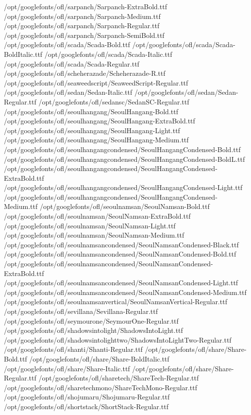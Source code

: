 /opt/googlefonts/ofl/sarpanch/Sarpanch-ExtraBold.ttf
/opt/googlefonts/ofl/sarpanch/Sarpanch-Medium.ttf
/opt/googlefonts/ofl/sarpanch/Sarpanch-Regular.ttf
/opt/googlefonts/ofl/sarpanch/Sarpanch-SemiBold.ttf
/opt/googlefonts/ofl/scada/Scada-Bold.ttf
/opt/googlefonts/ofl/scada/Scada-BoldItalic.ttf
/opt/googlefonts/ofl/scada/Scada-Italic.ttf
/opt/googlefonts/ofl/scada/Scada-Regular.ttf
/opt/googlefonts/ofl/scheherazade/Scheherazade-R.ttf
/opt/googlefonts/ofl/seaweedscript/SeaweedScript-Regular.ttf
/opt/googlefonts/ofl/sedan/Sedan-Italic.ttf
/opt/googlefonts/ofl/sedan/Sedan-Regular.ttf
/opt/googlefonts/ofl/sedansc/SedanSC-Regular.ttf
/opt/googlefonts/ofl/seoulhangang/SeoulHangang-Bold.ttf
/opt/googlefonts/ofl/seoulhangang/SeoulHangang-ExtraBold.ttf
/opt/googlefonts/ofl/seoulhangang/SeoulHangang-Light.ttf
/opt/googlefonts/ofl/seoulhangang/SeoulHangang-Medium.ttf
/opt/googlefonts/ofl/seoulhangangcondensed/SeoulHangangCondensed-Bold.ttf
/opt/googlefonts/ofl/seoulhangangcondensed/SeoulHangangCondensed-BoldL.ttf
/opt/googlefonts/ofl/seoulhangangcondensed/SeoulHangangCondensed-ExtraBold.ttf
/opt/googlefonts/ofl/seoulhangangcondensed/SeoulHangangCondensed-Light.ttf
/opt/googlefonts/ofl/seoulhangangcondensed/SeoulHangangCondensed-Medium.ttf
/opt/googlefonts/ofl/seoulnamsan/SeoulNamsan-Bold.ttf
/opt/googlefonts/ofl/seoulnamsan/SeoulNamsan-ExtraBold.ttf
/opt/googlefonts/ofl/seoulnamsan/SeoulNamsan-Light.ttf
/opt/googlefonts/ofl/seoulnamsan/SeoulNamsan-Medium.ttf
/opt/googlefonts/ofl/seoulnamsancondensed/SeoulNamsanCondensed-Black.ttf
/opt/googlefonts/ofl/seoulnamsancondensed/SeoulNamsanCondensed-Bold.ttf
/opt/googlefonts/ofl/seoulnamsancondensed/SeoulNamsanCondensed-ExtraBold.ttf
/opt/googlefonts/ofl/seoulnamsancondensed/SeoulNamsanCondensed-Light.ttf
/opt/googlefonts/ofl/seoulnamsancondensed/SeoulNamsanCondensed-Medium.ttf
/opt/googlefonts/ofl/seoulnamsanvertical/SeoulNamsanVertical-Regular.ttf
/opt/googlefonts/ofl/sevillana/Sevillana-Regular.ttf
/opt/googlefonts/ofl/seymourone/SeymourOne-Regular.ttf
/opt/googlefonts/ofl/shadowsintolight/ShadowsIntoLight.ttf
/opt/googlefonts/ofl/shadowsintolighttwo/ShadowsIntoLightTwo-Regular.ttf
/opt/googlefonts/ofl/shanti/Shanti-Regular.ttf
/opt/googlefonts/ofl/share/Share-Bold.ttf
/opt/googlefonts/ofl/share/Share-BoldItalic.ttf
/opt/googlefonts/ofl/share/Share-Italic.ttf
/opt/googlefonts/ofl/share/Share-Regular.ttf
/opt/googlefonts/ofl/sharetech/ShareTech-Regular.ttf
/opt/googlefonts/ofl/sharetechmono/ShareTechMono-Regular.ttf
/opt/googlefonts/ofl/shojumaru/Shojumaru-Regular.ttf
/opt/googlefonts/ofl/shortstack/ShortStack-Regular.ttf
